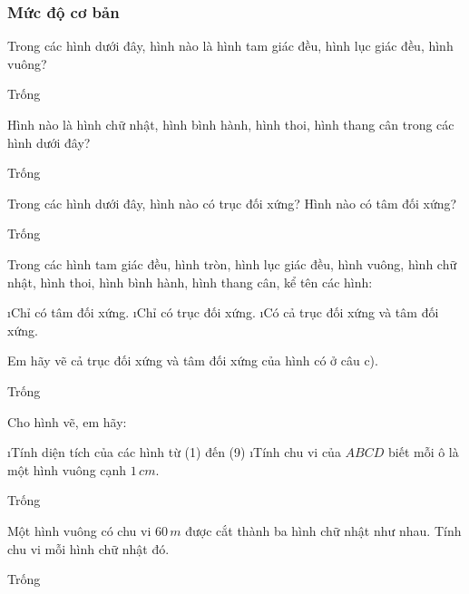 \subsubsection*{Mức độ cơ bản}
\begin{bt}
	Trong các hình dưới đây, hình nào là hình tam giác đều, hình lục giác đều, hình vuông?
	\begin{loigiaichuong38}
		Trống
	\end{loigiaichuong38}
\end{bt}
\begin{bt}
	Hình nào là hình chữ nhật, hình bình hành, hình thoi, hình thang cân trong các hình dưới đây? 
	\begin{loigiaichuong38}
		Trống
	\end{loigiaichuong38}
\end{bt} 
\begin{bt}
	Trong các hình dưới đây, hình nào có trục đối xứng? Hình nào có tâm đối xứng?
	\begin{loigiaichuong38}
		Trống
	\end{loigiaichuong38}
\end{bt}
\begin{bt}
	Trong các hình tam giác đều, hình tròn, hình lục giác đều, hình vuông, hình chữ nhật, hình thoi, hình bình hành, hình thang cân, kể tên các hình:
	\begin{enumerate}[a), leftmargin=*]
		\i Chỉ có tâm đối xứng.
		\i Chỉ có trục đối xứng.
		\i Có cả trục đối xứng và tâm đối xứng.
	\end{enumerate}
	Em hãy vẽ cả trục đối xứng và tâm đối xứng của hình có ở câu c).
	\begin{loigiaichuong38}
		Trống
	\end{loigiaichuong38}
\end{bt}
\begin{bt}
	Cho hình vẽ, em hãy:
	
	\begin{enumerate}[a), leftmargin=*]
		\i Tính diện tích của các hình từ (1) đến (9)
		\i Tính chu vi của $ABCD$ biết mỗi ô là một hình vuông cạnh $1\, cm$.
	\end{enumerate}
	\begin{loigiaichuong38}
		Trống
	\end{loigiaichuong38}
\end{bt}
\begin{bt}
	Một hình vuông có chu vi $60\, m$ được cắt thành ba hình chữ nhật như nhau. Tính chu vi mỗi hình chữ nhật đó.
	\begin{loigiaichuong38}
		Trống
	\end{loigiaichuong38}
\end{bt}
